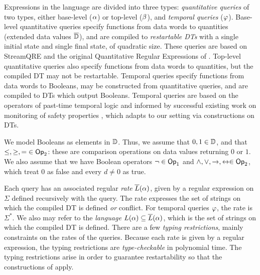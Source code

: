 Expressions in the language are divided into three types: \emph{quantitative queries} of two types, either base-level ($\alpha$) or top-level ($\beta$), and \emph{temporal queries} ($\varphi$). Base-level quantitative queries specify functions from data words to quantities (extended data values $\overline{\mathbb{D}{}}$), and are compiled to \emph{restartable DTs} with a single initial state and single final state, of quadratic size. These queries are based on StreamQRE and the original Quantitative Regular Expressions of \cite{QRE}. Top-level quantitative queries also specify functions from data words to quantities, but the compiled DT may not be restartable. Temporal queries specify functions from data words to Booleans, may be constructed from quantitative queries, and are compiled to DTs which output Booleans. Temporal queries are based on the operators of past-time temporal logic \cite{manna2012temporal} and informed by successful existing work on monitoring of safety properties \cite{havelund2004efficient}, which adapts to our setting via constructions on DTs.

We model Booleans as elements in $\mathbb{D}$. Thus, we assume that $0, 1 \in \mathbb{D}$, and that $\le, \ge, = \;\in \textsf{Op}_2$: these are comparison operations on data values returning $0$ or $1$. We also assume that we have Boolean operators $\lnot \in \textsf{Op}_1$ and $\land, \lor, \to, \leftrightarrow \in \textsf{Op}_2$,
which treat $0$ as false and every $d \ne 0$ as true.

Each query has an associated regular \emph{rate} $\overline{L}(\alpha)$, given by a regular expression on $\Sigma$ defined recursively with the query. The rate expresses the set of strings on which the compiled DT is defined \emph{ or } conflict. For temporal queries $\varphi$, the rate is $\Sigma^{*}$. We also may refer to the \emph{language} $L(\alpha) \subseteq \overline{L}(\alpha)$, which is the set of strings on which the compiled DT is defined.
There are a few \emph{typing restrictions}, mainly constraints on the rates of the queries. Because each rate is given by a regular expression, the typing restrictions are \emph{type-checkable} in polynomial time.
The typing restrictions arise in order to guarantee restartability so that the constructions of  apply.


